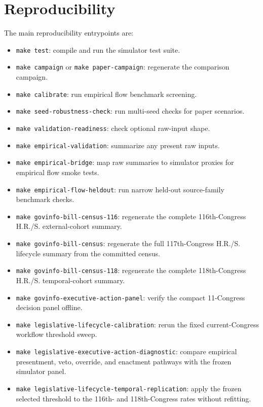 \documentclass[manuscript]{acmart}
\begin{document}
\section{Reproducibility}
\label{sec:appendix-reproducibility}

The main reproducibility entrypoints are:

\begin{itemize}
  \item \texttt{make test}: compile and run the simulator test suite.
  \item \texttt{make campaign} or \texttt{make paper-campaign}: regenerate the comparison campaign.
  \item \texttt{make calibrate}: run empirical flow benchmark screening.
  \item \texttt{make seed-robustness-check}: run multi-seed checks for paper scenarios.
  \item \texttt{make validation-readiness}: check optional raw-input shape.
  \item \texttt{make empirical-validation}: summarize any present raw inputs.
  \item \texttt{make empirical-bridge}: map raw summaries to simulator proxies for empirical flow smoke tests.
  \item \texttt{make empirical-flow-heldout}: run narrow held-out source-family benchmark checks.
  \item \texttt{make govinfo-bill-census-116}: regenerate the complete 116th-Congress H.R./S. external-cohort summary.
  \item \texttt{make govinfo-bill-census}: regenerate the full 117th-Congress H.R./S. lifecycle summary from the committed census.
  \item \texttt{make govinfo-bill-census-118}: regenerate the complete 118th-Congress H.R./S. temporal-cohort summary.
  \item \texttt{make govinfo-executive-action-panel}: verify the compact 11-Congress decision panel offline.
  \item \texttt{make legislative-lifecycle-calibration}: rerun the fixed current-Congress workflow threshold sweep.
  \item \texttt{make legislative-executive-action-diagnostic}: compare empirical presentment, veto, override, and enactment pathways with the frozen simulator panel.
  \item \texttt{make legislative-lifecycle-temporal-replication}: apply the frozen selected threshold to the 116th- and 118th-Congress rates without refitting.

\end{itemize}
\end{document}
